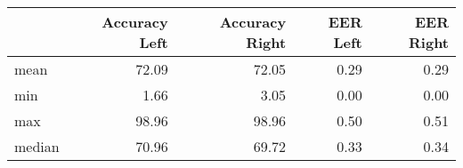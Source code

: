 \begin{tabular}{lrrrr}
\toprule
{} &  Accuracy Left &  Accuracy Right &  EER Left &  EER Right \\
\midrule
mean   &          72.09 &           72.05 &      0.29 &       0.29 \\
min    &           1.66 &            3.05 &      0.00 &       0.00 \\
max    &          98.96 &           98.96 &      0.50 &       0.51 \\
median &          70.96 &           69.72 &      0.33 &       0.34 \\
\bottomrule
\end{tabular}
